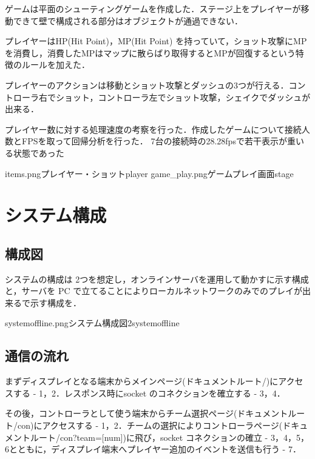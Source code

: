 ゲームは平面のシューティングゲームを作成した．ステージ上をプレイヤーが移動できて壁で構成される部分はオブジェクトが通過できない．

プレイヤーはHP(Hit Point)，MP(Hit Point) を持っていて，ショット攻撃にMPを消費し，消費したMPはマップに散らばり取得するとMPが回復するという特徴のルールを加えた．

プレイヤーのアクションは移動とショット攻撃とダッシュの3つが行える．コントローラ右でショット，コントローラ左でショット攻撃，シェイクでダッシュが出来る．

プレイヤー数に対する処理速度の考察を行った．作成したゲームについて接続人数とFPSを取って回帰分析を行った．
7台の接続時の28.28fpsで若干表示が重いる状態であった

\myfigtwo
{items.png}{プレイヤー・ショット}{player}
{game_play.png}{ゲームプレイ画面}{stage}


\newpage
\section{システム構成}
\subsection{構成図}
システムの構成は 2つを想定し，オンラインサーバを運用して動かすに示す構成と，サーバを PC で立てることによりローカルネットワークのみでのプレイが出来るで示す構成を．

{systemoffline.png}{システム構成図2}{systemoffline}

\subsection{通信の流れ}
まずディスプレイとなる端末からメインページ(ドキュメントルート/)にアクセスする - 1，2．レスポンス時にsocket のコネクションを確立する - 3，4．

その後，コントローラとして使う端末からチーム選択ページ(ドキュメントルート/con)にアクセスする - 1，2．チームの選択によりコントローラページ(ドキュメントルート/con?team=[num])に飛び，socket コネクションの確立 - 3，4，5，6とともに，ディスプレイ端末へプレイヤー追加のイベントを送信も行う - 7．

